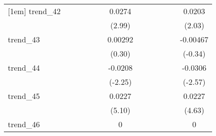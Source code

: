{\begin{tabular}{l*{12}{c}}
[1em]
trend\_42    &                     &                     &                     &                     &                     &      0.0274\sym{**} &                     &                     &                     &                     &                     &      0.0203\sym{*}  \\
            &                     &                     &                     &                     &                     &      (2.99)         &                     &                     &                     &                     &                     &      (2.03)         \\
[1em]
trend\_43    &                     &                     &                     &                     &                     &     0.00292         &                     &                     &                     &                     &                     &    -0.00467         \\
            &                     &                     &                     &                     &                     &      (0.30)         &                     &                     &                     &                     &                     &     (-0.34)         \\
[1em]
trend\_44    &                     &                     &                     &                     &                     &     -0.0208\sym{*}  &                     &                     &                     &                     &                     &     -0.0306\sym{*}  \\
            &                     &                     &                     &                     &                     &     (-2.25)         &                     &                     &                     &                     &                     &     (-2.57)         \\
[1em]
trend\_45    &                     &                     &                     &                     &                     &      0.0227\sym{***}&                     &                     &                     &                     &                     &      0.0227\sym{***}\\
            &                     &                     &                     &                     &                     &      (5.10)         &                     &                     &                     &                     &                     &      (4.63)         \\
[1em]
trend\_46    &                     &                     &                     &                     &                     &           0         &                     &                     &                     &                     &                     &           0         \\

\end{tabular}}
